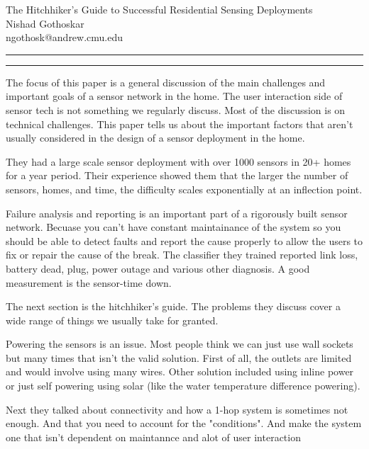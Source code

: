 \documentclass[11pt]{article}
\newcommand{\question}[2] {\vspace{.25in} \hrule\vspace{0.5em}
	\noindent{\bf #1: #2} \vspace{0.5em}
	\hrule \vspace{.10in}}
\newcommand{\myname}{Nishad Gothoskar}
\newcommand{\myandrew}{ngothosk}
\begin{document}
	
	\medskip                        %
	
	\thispagestyle{plain}
	\begin{center}                  %
		{\Large The Hitchhiker’s Guide to Successful Residential Sensing Deployments
} \\
		\myname \\
		\myandrew @andrew.cmu.edu\\
	\end{center}
	
	\question{1}{Summary}
	\quad The focus of this paper is a general discussion of the main challenges and important goals of a sensor network in the home. The user interaction side of sensor tech is not something we regularly discuss. Most of the discussion is on technical challenges. This paper tells us about the important factors that aren't usually considered in the design of a sensor deployment in the home.
	
	\quad They had a large scale sensor deployment with over 1000 sensors in 20+ homes for a year period. Their experience showed them that the larger the number of sensors, homes, and time, the difficulty scales exponentially at an inflection point.
	
	\quad Failure analysis and reporting is an important part of a rigorously built sensor network. Becuase you can't have constant maintainance of the system so you should be able to detect faults and report the cause properly to allow the users to fix or repair the cause of the break. The classifier they trained reported link loss, battery dead, plug, power outage and various other diagnosis. A good measurement is the sensor-time down.
	
	\quad The next section is the hitchhiker's guide. The problems they discuss cover a wide range of things we usually take for granted.
	
	\quad Powering the sensors is an issue. Most people think we can just use wall sockets but many times that isn't the valid solution. First of all, the outlets are limited and would involve using many wires. Other solution included using inline power or just self powering using solar (like the water temperature difference powering).
	
	\quad Next they talked about connectivity and how a 1-hop system is sometimes not enough. And that you need to account for the "conditions". And make the system one that isn't dependent on maintannce and alot of user interaction
	
\end{document}
